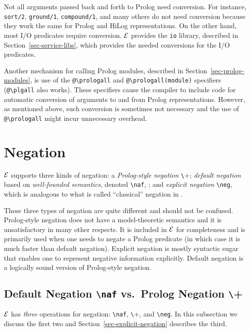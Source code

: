 \documentclass[11pt]{article}
\newcommand{\ERGO}{\mbox{\ensuremath{\cal{E}}\smaller{{\sc{RGO}}}}\xspace}
\newcommand{\FLSYSTEM}{\ERGO}
\newcommand{\bs}{\textbackslash}
\newcommand{\PLGNAF}{\mbox{\texttt{\bs}+}\xspace}
\newcommand{\RULELOGNAF}{{\texttt{{\bs}naf}}\xspace}
\newcommand{\RULELOGNEG}{{\texttt{{\bs}neg}}\xspace}
\begin{document}
Not all arguments passed back and forth to Prolog need conversion. For
instance, {\tt sort/2}, {\tt ground/1}, {\tt compound/1}, and many others
do not need conversion because they work the same for Prolog and HiLog
representations. On the other hand, most I/O predicates require conversion.
\FLSYSTEM provides the {\tt io} library, described in
Section~\ref{sec-service-libs}, which provides the needed conversions for
the I/O predicates.


\index{"@\bs{}prologall}
\index{"@\bs{}plgall}
Another mechanism for calling Prolog modules, described in
Section~\ref{sec-prolog-modules}, is use of the {\tt @\bs{}prologall} and
{\tt @\bs{}prologall(module)} specifiers ({\tt @\bs{}plgall} also works). These
specifiers cause the compiler to include code for automatic conversion of
arguments to and from Prolog representations. However, as mentioned above,
such conversion is sometimes not necessary and the use of {\tt
  @\bs{}prologall} might incur unnecessary overhead.



\section{Negation} \label{sec:negation}


\FLSYSTEM supports three kinds of negation: a \emph{Prolog-style negation}
  \PLGNAF \cite{Cla78}; \emph{default negation} based on
\emph{well-founded semantics}, denoted \texttt{\RULELOGNAF}, 
\cite{gelder-alternating-89,gelder-ross-schlipf-91}; and \emph{explicit
  negation} \texttt{\RULELOGNEG}, which is analogous to what is called ``classical'' negation in
\cite{gelfond91classical}.
 
These three types of negation are quite different and should not be
confused. Prolog-style negation does not have a model-theoretic semantics
and it is unsatisfactory in many other respects. It is included in \FLSYSTEM
for completeness and is primarily used when one needs to negate a Prolog
predicate (in which case it is much faster than default negation).
Explicit negation is mostly syntactic sugar that enables one to represent
negative information explicitly. Default negation is a logically sound
version of Prolog-style negation.

\subsection{Default Negation \RULELOGNAF  vs.~Prolog Negation \PLGNAF}\label{sec-negation}
\index{\RULELOGNAF}
\index{\PLGNAF}
\FLSYSTEM has \emph{three} operations for negation: \RULELOGNAF, \PLGNAF, and {\tt \RULELOGNEG}.
In this subsection we discuss the first two and
Section~\ref{sec-explicit-negation} describes the third.
\end{document}
